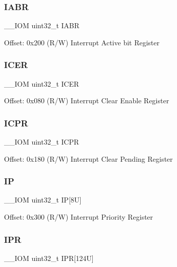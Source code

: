\subsubsection{\texorpdfstring{IABR}{IABR}}
{\footnotesize\ttfamily \+\_\+\+\_\+\+I\+OM uint32\+\_\+t I\+A\+BR}

Offset\+: 0x200 (R/W) Interrupt Active bit Register \mbox{\label{struct_n_v_i_c___type_ae7aedd01fc75b7b98c6ef887cc21245b}} 
\subsubsection{\texorpdfstring{ICER}{ICER}}
{\footnotesize\ttfamily \+\_\+\+\_\+\+I\+OM uint32\+\_\+t I\+C\+ER}

Offset\+: 0x080 (R/W) Interrupt Clear Enable Register \mbox{\label{struct_n_v_i_c___type_af27404125e8333bfac9a13da10f924ca}} 
\subsubsection{\texorpdfstring{ICPR}{ICPR}}
{\footnotesize\ttfamily \+\_\+\+\_\+\+I\+OM uint32\+\_\+t I\+C\+PR}

Offset\+: 0x180 (R/W) Interrupt Clear Pending Register \mbox{\label{struct_n_v_i_c___type_a54051f32091607a64e1e044413da3b8b}} 
\subsubsection{\texorpdfstring{IP}{IP}}
{\footnotesize\ttfamily \+\_\+\+\_\+\+I\+OM uint32\+\_\+t IP\mbox{[}8\+U\mbox{]}}

Offset\+: 0x300 (R/W) Interrupt Priority Register \mbox{\label{struct_n_v_i_c___type_a5a3763fa8e079c90b6a8e09c0587eef4}} 
\subsubsection{\texorpdfstring{IPR}{IPR}\hspace{0.1cm}{\footnotesize\ttfamily [1/2]}}
{\footnotesize\ttfamily \+\_\+\+\_\+\+I\+OM uint32\+\_\+t I\+PR\mbox{[}124\+U\mbox{]}}

